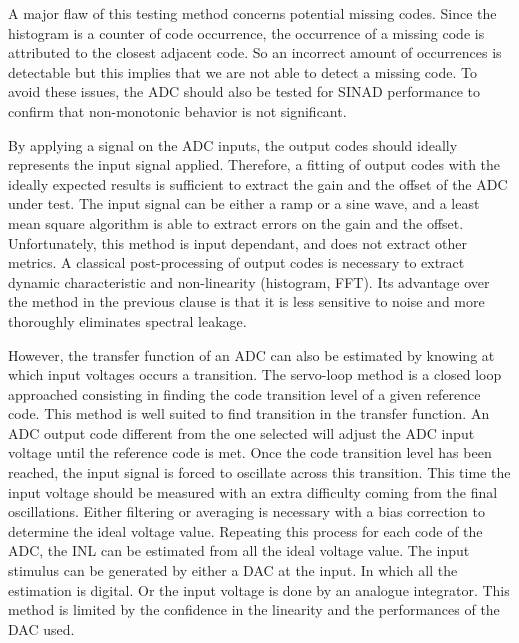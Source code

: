 A major flaw of this testing method concerns potential missing codes. Since the histogram is a counter of code occurrence, the occurrence of a missing code is attributed to the closest adjacent code. So an incorrect amount of occurrences is detectable but this implies that we are not able to detect a missing code. To avoid these issues, the ADC should also be tested for SINAD performance to confirm that non-monotonic behavior is not significant.

By applying a signal on the ADC inputs, the output codes should ideally represents the input signal applied. Therefore, a fitting of output codes with the ideally expected results is sufficient to extract the gain and the offset of the ADC under test. The input signal can be either a ramp or a sine wave, and a least mean square algorithm is able to extract errors on the gain and the offset.
Unfortunately, this method is input dependant, and does not extract other metrics. A classical post-processing of output codes is necessary to extract dynamic characteristic and non-linearity (histogram, FFT). Its advantage over the method in the previous clause is that it is less sensitive to noise and more thoroughly eliminates spectral leakage.

However, the transfer function of an ADC can also be estimated by knowing at which input voltages occurs a transition. The servo-loop method is a closed loop approached consisting in finding the code transition level of a given reference code. This method is well suited to find transition in the transfer function.
An ADC output code different from the one selected will adjust the ADC input voltage until the reference code is met. Once the code transition level has been reached, the input signal is forced to oscillate across this transition.
This time the input voltage should be measured with an extra difficulty coming from the final oscillations. Either filtering or averaging is necessary with a bias correction to determine the ideal voltage value. Repeating this process for each code of the ADC, the INL can be estimated from all the ideal voltage value.
The input stimulus can be generated by either a DAC at the input. In which all the estimation is digital. Or the input voltage is done by an analogue integrator. This method is limited by the confidence in the linearity and the performances of the DAC used.

